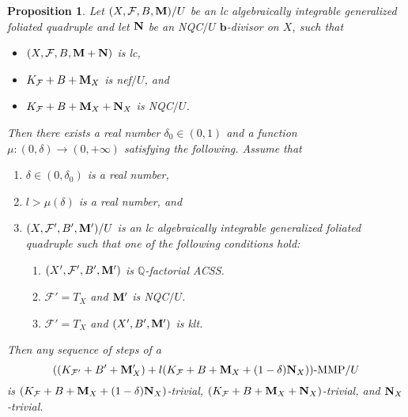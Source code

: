 \documentclass[11pt]{amsart}
\numberwithin{equation}{section}
\newcommand{\bb}{\bm{b}}
\newcommand{\Mm}{{\bf{M}}}
\newcommand{\Nn}{{\bf{N}}}
\newcommand{\Qq}{\mathbb{Q}}
\newcommand{\Ff}{\mathcal{F}}
\newtheorem{prop}[thm]{Proposition}
\theoremstyle{definition}
\theoremstyle{definition}
\theoremstyle{definition}
\begin{document}
\begin{prop}\label{prop: kf+k_x mmp trivial}
    Let $(X,\Ff,B,\Mm)/U$ be an lc algebraically integrable generalized foliated quadruple and let $\Nn$ be an NQC$/U$ $\bb$-divisor on $X$, such that
    \begin{itemize}
        \item $(X,\Ff,B,\Mm+\Nn)$ is lc,
        \item $K_{\Ff}+B+\Mm_X$ is nef$/U$, and
        \item  $K_{\Ff}+B+\Mm_X+\Nn_X$ is NQC$/U$.
    \end{itemize}
    Then there exists a real number $\delta_0\in (0,1)$ and a function $\mu: (0,\delta)\rightarrow (0,+\infty)$ satisfying the following. Assume that
    \begin{enumerate}
        \item $\delta\in (0,\delta_0)$ is a real number,
        \item $l>\mu(\delta)$ is a real number, and
        \item $(X,\Ff',B',\Mm')/U$ is an lc algebraically integrable generalized foliated quadruple such that one of the following conditions hold:
        \begin{enumerate}
            \item $(X',\Ff',B',\Mm')$ is $\Qq$-factorial ACSS.
            \item $\Ff'=T_X$ and $\Mm'$ is NQC$/U$.
            \item $\Ff'=T_X$ and $(X',B',\Mm')$ is klt.
        \end{enumerate}
    \end{enumerate}
    Then any sequence of steps of a 
    $$((K_{\Ff'}+B'+\Mm'_X)+l(K_{\Ff}+B+\Mm_X+(1-\delta)\Nn_X))\text{-MMP}/U$$
    is $(K_{\Ff}+B+\Mm_X+(1-\delta)\Nn_X)$-trivial, $(K_{\Ff}+B+\Mm_X+\Nn_X)$-trivial, and $\Nn_X$-trivial.
\end{prop}
\end{document}
